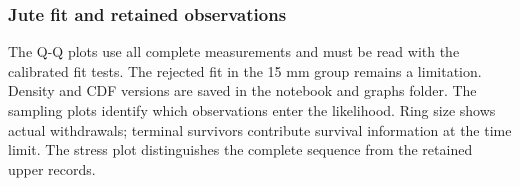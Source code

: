 \subsubsection{Jute fit and retained observations}
The Q-Q plots use all complete measurements and must be read with the calibrated fit tests. The rejected fit in the 15 mm group remains a limitation. Density and CDF versions are saved in the notebook and graphs folder.
The sampling plots identify which observations enter the likelihood. Ring size shows actual withdrawals; terminal survivors contribute survival information at the time limit. The stress plot distinguishes the complete sequence from the retained upper records.
\FloatBarrier
